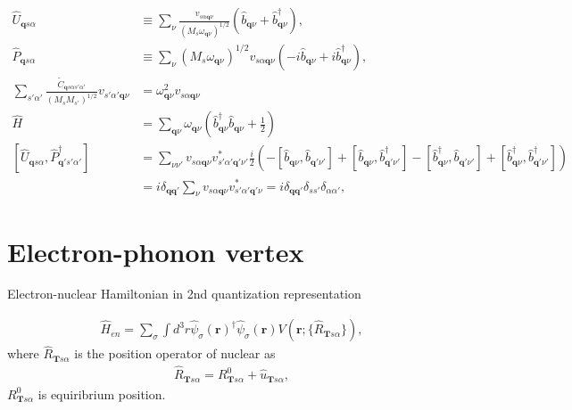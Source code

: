\documentclass{article}
\begin{document}
\begin{align}
    \hat{U}_{\textbf{q}s\alpha} &\equiv \sum_{\nu} \frac{v_{s\alpha \textbf{q}\nu}}{(M_s \omega_{\textbf{q}\nu})^{1/2}} 
    (\hat{b}_{\textbf{q}\nu} + \hat{b}_{\textbf{q}\nu}^\dagger),
    \label{eq_ub}
    \\
    \hat{P}_{\textbf{q}s\alpha} &\equiv \sum_{\nu} (M_s \omega_{\textbf{q}\nu})^{1/2} v_{s\alpha \textbf{q}\nu}
    (-i \hat{b}_{\textbf{q}\nu} + i \hat{b}_{\textbf{q}\nu}^\dagger),
    \\
    \sum_{s'\alpha'} \frac{\tilde{C}_{\textbf{q}s\alpha s'\alpha'}}{(M_s M_{s'})^{1/2}} v_{s'\alpha' \textbf{q}\nu} 
    &= \omega_{\textbf{q}\nu}^2 v_{s\alpha \textbf{q}\nu}
    \label{eigen}
    \\
    \hat{H} &=\sum_{{\textbf{q}\nu}} \omega_{\textbf{q}\nu} \left(\hat{b}_{\textbf{q}\nu}^\dagger\hat{b}_{\textbf{q}\nu} + \frac{1}{2}\right)
    \\
    [\hat{U}_{\textbf{q}s\alpha}, \hat{P}_{\textbf{q}'s'\alpha'}^\dagger] 
    &= \sum_{\nu \nu'} v_{s \alpha \textbf{q} \nu} v_{s' \alpha' \textbf{q}' \nu'}^*
    \frac{i}{2}(-[\hat{b}_{\textbf{q} \nu}, \hat{b}_{\textbf{q}' \nu'}] + [\hat{b}_{\textbf{q} \nu}, \hat{b}_{\textbf{q}' \nu'}^\dagger]
    -[\hat{b}_{\textbf{q} \nu}^\dagger, \hat{b}_{\textbf{q}' \nu'}] + [\hat{b}_{\textbf{q} \nu}^\dagger, \hat{b}_{\textbf{q}' \nu'}^\dagger])
    \nonumber \\
    &= i \delta_{\textbf{q}\textbf{q}'} \sum_\nu v_{s \alpha \textbf{q} \nu} v_{s' \alpha' \textbf{q}' \nu}^* 
    = i \delta_{\textbf{q}\textbf{q}'} \delta_{s s'}\delta_{\alpha \alpha'},
\end{align}

\section{Electron-phonon vertex}

Electron-nuclear Hamiltonian in 2nd quantization representation

\begin{align}
    \hat{H}_{en} = \sum_{\sigma} \int d^3 r \hat{\psi}_{\sigma}(\textbf{r})^\dagger 
    \hat{\psi}_{\sigma}(\textbf{r}) V(\textbf{r};\{\hat{R}_{\textbf{T}s\alpha}\}),
\end{align}
where $\hat{R}_{\textbf{T}s\alpha}$ is the position operator of nuclear as
\begin{align}
    \hat{R}_{\textbf{T}s\alpha} = R^0_{\textbf{T}s\alpha} + \hat{u}_{\textbf{T}s\alpha},
\end{align}
$R^0_{\textbf{T}s\alpha}$ is equiribrium position.
\end{document}
